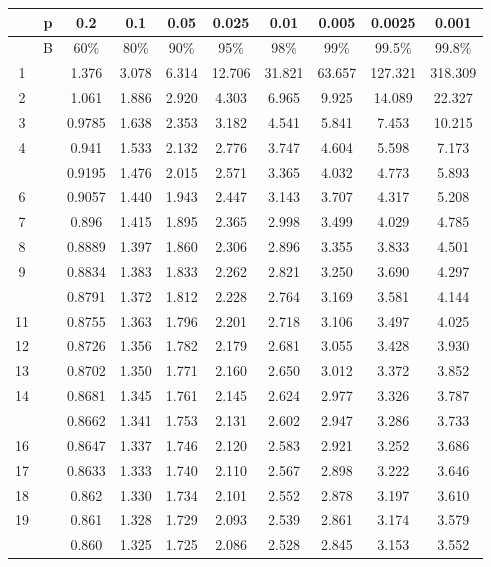 \documentclass[
]{book}
\begin{document}
\begin{tabular}{cccccccccc}
\toprule
 & p & 0.2 & 0.1 & 0.05 & 0.025 & 0.01 & 0.005 & 0.0025 & 0.001\\
\midrule
 & B & 60\% & 80\% & 90\% & 95\% & 98\% & 99\% & 99.5\% & 99.8\%\\
1 &  & 1.376 & 3.078 & 6.314 & 12.706 & 31.821 & 63.657 & 127.321 & 318.309\\
2 &  & 1.061 & 1.886 & 2.920 & 4.303 & 6.965 & 9.925 & 14.089 & 22.327\\
3 &  & 0.9785 & 1.638 & 2.353 & 3.182 & 4.541 & 5.841 & 7.453 & 10.215\\
4 &  & 0.941 & 1.533 & 2.132 & 2.776 & 3.747 & 4.604 & 5.598 & 7.173\\
\addlinespace
5 &  & 0.9195 & 1.476 & 2.015 & 2.571 & 3.365 & 4.032 & 4.773 & 5.893\\
6 &  & 0.9057 & 1.440 & 1.943 & 2.447 & 3.143 & 3.707 & 4.317 & 5.208\\
7 &  & 0.896 & 1.415 & 1.895 & 2.365 & 2.998 & 3.499 & 4.029 & 4.785\\
8 &  & 0.8889 & 1.397 & 1.860 & 2.306 & 2.896 & 3.355 & 3.833 & 4.501\\
9 &  & 0.8834 & 1.383 & 1.833 & 2.262 & 2.821 & 3.250 & 3.690 & 4.297\\
\addlinespace
10 &  & 0.8791 & 1.372 & 1.812 & 2.228 & 2.764 & 3.169 & 3.581 & 4.144\\
11 &  & 0.8755 & 1.363 & 1.796 & 2.201 & 2.718 & 3.106 & 3.497 & 4.025\\
12 &  & 0.8726 & 1.356 & 1.782 & 2.179 & 2.681 & 3.055 & 3.428 & 3.930\\
13 &  & 0.8702 & 1.350 & 1.771 & 2.160 & 2.650 & 3.012 & 3.372 & 3.852\\
14 &  & 0.8681 & 1.345 & 1.761 & 2.145 & 2.624 & 2.977 & 3.326 & 3.787\\
\addlinespace
15 &  & 0.8662 & 1.341 & 1.753 & 2.131 & 2.602 & 2.947 & 3.286 & 3.733\\
16 &  & 0.8647 & 1.337 & 1.746 & 2.120 & 2.583 & 2.921 & 3.252 & 3.686\\
17 &  & 0.8633 & 1.333 & 1.740 & 2.110 & 2.567 & 2.898 & 3.222 & 3.646\\
18 &  & 0.862 & 1.330 & 1.734 & 2.101 & 2.552 & 2.878 & 3.197 & 3.610\\
19 &  & 0.861 & 1.328 & 1.729 & 2.093 & 2.539 & 2.861 & 3.174 & 3.579\\
\addlinespace
20 &  & 0.860 & 1.325 & 1.725 & 2.086 & 2.528 & 2.845 & 3.153 & 3.552\\

\end{tabular}
\end{document}
